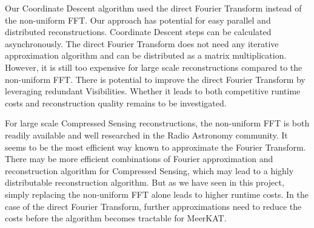Our Coordinate Descent algorithm used the direct Fourier Transform instead of the non-uniform FFT. Our approach has potential for easy parallel and distributed reconstructions. Coordinate Descent steps can be calculated asynchronously. The direct Fourier Transform does not need any iterative approximation algorithm and can be distributed as a matrix multiplication. However, it is still too expensive for large scale reconstructions compared to the non-uniform FFT. There is potential to improve the direct Fourier Transform by leveraging redundant Visibilities. Whether it leads to both competitive runtime costs and reconstruction quality remains to be investigated.

For large scale Compressed Sensing reconstructions, the non-uniform FFT is both readily available and well researched in the Radio Astronomy community. It seems to be the most efficient way known to approximate the Fourier Transform. There may be more efficient combinations of Fourier approximation and reconstruction algorithm for Compressed Sensing, which may lead to a highly distributable reconstruction algorithm. But as we have seen in this project, simply replacing the non-uniform FFT alone leads to higher runtime costs. In the case of the direct Fourier Transform, further approximations need to reduce the costs before the algorithm becomes tractable for MeerKAT.





















 
